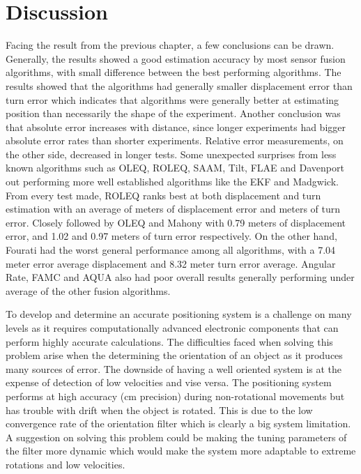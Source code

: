 \section{Discussion}
Facing the result from the previous chapter, a few conclusions can be drawn. Generally, the results showed a good estimation accuracy by most sensor fusion algorithms, with small difference between the best performing algorithms. The results showed that the algorithms had generally smaller displacement error than turn error which indicates that algorithms were generally better at estimating position than necessarily the shape of the experiment. Another conclusion was that absolute error increases with distance, since longer experiments had bigger absolute error rates than shorter experiments. Relative error measurements, on the other side, decreased in longer tests. Some unexpected surprises from less known algorithms such as OLEQ, ROLEQ, SAAM, Tilt, FLAE and Davenport out performing more well established algorithms like the EKF and Madgwick. From every test made, ROLEQ ranks best at both displacement and turn estimation with an average of  meters of displacement error and  meters of turn error. Closely followed by OLEQ and Mahony with 0.79 meters of displacement error, and 1.02 and 0.97 meters of turn error respectively. On the other hand, Fourati had the worst general performance among all algorithms, with a 7.04 meter error average displacement and 8.32 meter turn error average. Angular Rate, FAMC and AQUA also had poor overall results generally performing under average of the other fusion algorithms.

\begin{figure}[!h]
    \centering
    
\end{figure}

To develop and determine an accurate positioning system is a challenge on many levels as it requires computationally advanced electronic components that can perform highly accurate calculations. The difficulties faced when solving this problem arise when the determining the orientation of an object as it produces many sources of error. The downside of having a well oriented system is at the expense of detection of low velocities and vise versa. The positioning system performs at high accuracy (cm precision) during non-rotational movements but has trouble with drift when the object is rotated. This is due to the low convergence rate of the orientation filter which is clearly a big system limitation. A suggestion on solving this problem could be making the tuning parameters of the filter more dynamic which would make the system more adaptable to extreme rotations and low velocities.

